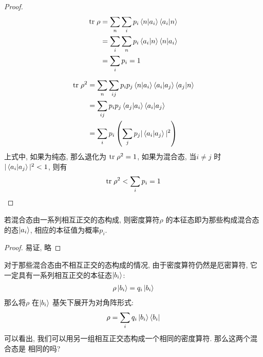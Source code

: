 \begin{proof}
  \begin{equation}
    \begin{aligned}
      {\rm tr}\; \rho &= \sum_{n} \sum_{i} p_{i}\bra{n}\ket{a_{i}}\bra{a_{i}}\ket{n} \\
                      &= \sum_{i} \sum_{n} p_{i} \bra{a_{i}}\ket{n}\bra{n}\ket{a_{i}} \\
                      &= \sum_{i} p_{i} = 1
    \end{aligned}
  \end{equation}

  \begin{equation}
    \begin{aligned}
      {\rm tr}\; \rho^{2} &= \sum_{n} \sum_{ij} p_{i} p_{j}\bra{n}\ket{a_{i}}\bra{a_{i}}\ket{a_{j}}\bra{a_{j}}\ket{n}\\
                          &= \sum_{ij}p_{i}p_{j} \bra{a_{j}}\ket{a_{i}}\bra{a_{i}}\ket{a_{j}}\\
                          &= \sum_{i} p_{i} \left(\sum_{j} p_{j} |\bra{a_{i}}\ket{a_{j}}|^{2}\right)
    \end{aligned}
  \end{equation}
  上式中, 如果为纯态, 那么退化为 ${\rm tr}\; \rho^{2} = 1$, 如果为混合态, 当$i\neq j$
  时$|\bra{a_{i}}\ket{a_{j}}|^{2}<1$, 则有
  \begin{equation}
    \begin{aligned}
      {\rm tr}\; \rho^{2} < \sum_{i}p_{i} = 1
    \end{aligned}
  \end{equation}
\end{proof}

\begin{theorem}[混合态的正交分解]
  若混合态由一系列相互正交的态构成, 则密度算符$\rho$ 的本征态即为那些构成混合态的态$\ket{a_{i}}$,
  相应的本征值为概率$p_{i}$.
\end{theorem}
\begin{proof}
  易证, 略
\end{proof}
\begin{remark}
  对于那些混合态由不相互正交的态构成的情况, 由于密度算符仍然是厄密算符, 它一定具有一系列相互正交的本征态$\ket{b_{i}}$:
  \begin{equation}
    \begin{aligned}
      \rho \ket{b_{i}} = q_{i} \ket{b_{i}}
    \end{aligned}
  \end{equation}
  那么将$\rho$ 在$\ket{b_{i}}$ 基矢下展开为对角阵形式:
  \begin{equation}
    \begin{aligned}
      \rho = \sum_{i} q_{i} \ket{b_{i}}\bra{b_{i}}
    \end{aligned}
  \end{equation}
  可以看出, 我们可以用另一组相互正交态构成一个相同的密度算符. 那么这两个混合态是
  相同的吗?
\end{remark}


